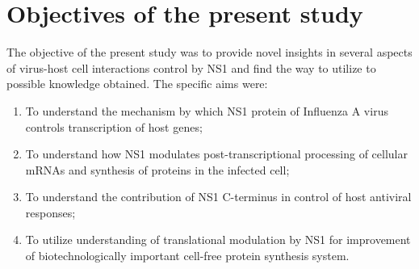 \newpage
\section{Objectives of the present study}

The objective of the present study was to provide novel insights in several aspects of virus-host cell interactions control by NS1 and find the way to utilize to possible knowledge obtained. The specific aims were:

	\begin{enumerate}
		\item To understand the mechanism by which NS1 protein of Influenza A virus controls transcription of host genes;
		
		\item To understand how NS1 modulates post-transcriptional processing of cellular mRNAs and synthesis of proteins in the infected cell;
		
		\item To understand the contribution of NS1 C-terminus in control of host antiviral responses;
		
		\item To utilize understanding of translational modulation by NS1 for improvement of biotechnologically important cell-free protein synthesis system.
		
	\end{enumerate}